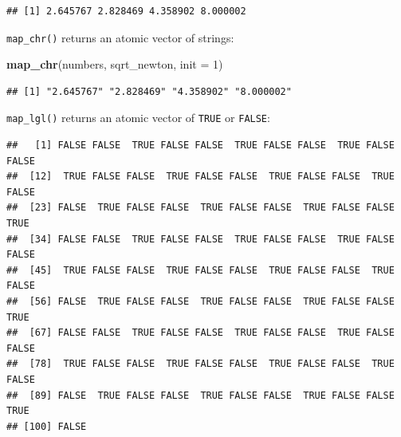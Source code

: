 \documentclass[]{gitbook}
\newenvironment{Shaded}{\begin{snugshade}}{\end{snugshade}}
\newcommand{\ControlFlowTok}[1]{\textcolor[rgb]{0.13,0.29,0.53}{\textbf{#1}}}
\newcommand{\DataTypeTok}[1]{\textcolor[rgb]{0.13,0.29,0.53}{#1}}
\newcommand{\DecValTok}[1]{\textcolor[rgb]{0.00,0.00,0.81}{#1}}
\newcommand{\KeywordTok}[1]{\textcolor[rgb]{0.13,0.29,0.53}{\textbf{#1}}}
\newcommand{\NormalTok}[1]{#1}
\newcommand{\OperatorTok}[1]{\textcolor[rgb]{0.81,0.36,0.00}{\textbf{#1}}}
\newcommand{\OtherTok}[1]{\textcolor[rgb]{0.56,0.35,0.01}{#1}}
\newcommand{\StringTok}[1]{\textcolor[rgb]{0.31,0.60,0.02}{#1}}
\begin{document}
\begin{verbatim}
## [1] 2.645767 2.828469 4.358902 8.000002
\end{verbatim}

\texttt{map\_chr()} returns an atomic vector of strings:

\begin{Shaded}
\begin{Highlighting}[]
\KeywordTok{map_chr}\NormalTok{(numbers, sqrt_newton, }\DataTypeTok{init =} \DecValTok{1}\NormalTok{)}
\end{Highlighting}
\end{Shaded}

\begin{verbatim}
## [1] "2.645767" "2.828469" "4.358902" "8.000002"
\end{verbatim}

\texttt{map\_lgl()} returns an atomic vector of \texttt{TRUE} or \texttt{FALSE}:

\begin{Shaded}
\end{Shaded}

\begin{verbatim}
##   [1] FALSE FALSE  TRUE FALSE FALSE  TRUE FALSE FALSE  TRUE FALSE FALSE
##  [12]  TRUE FALSE FALSE  TRUE FALSE FALSE  TRUE FALSE FALSE  TRUE FALSE
##  [23] FALSE  TRUE FALSE FALSE  TRUE FALSE FALSE  TRUE FALSE FALSE  TRUE
##  [34] FALSE FALSE  TRUE FALSE FALSE  TRUE FALSE FALSE  TRUE FALSE FALSE
##  [45]  TRUE FALSE FALSE  TRUE FALSE FALSE  TRUE FALSE FALSE  TRUE FALSE
##  [56] FALSE  TRUE FALSE FALSE  TRUE FALSE FALSE  TRUE FALSE FALSE  TRUE
##  [67] FALSE FALSE  TRUE FALSE FALSE  TRUE FALSE FALSE  TRUE FALSE FALSE
##  [78]  TRUE FALSE FALSE  TRUE FALSE FALSE  TRUE FALSE FALSE  TRUE FALSE
##  [89] FALSE  TRUE FALSE FALSE  TRUE FALSE FALSE  TRUE FALSE FALSE  TRUE
## [100] FALSE
\end{verbatim}
\end{document}
